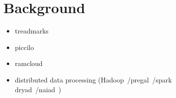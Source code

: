 \section{Background}
\label{sec:background}

\begin{itemize}
    \item treadmarks~\cite{Keleher1994}  \\
    \item piccilo~\cite{piccolo}   \\
    \item ramcloud~\cite{Ousterhout:2015:RSS:2818727.2806887}  \\
    \item distributed data processing (Hadoop~\cite{Dean2004}/pregal~\cite{Malewicz:2010:PSL:1807167.1807184}/spark~\cite{180560} \\ dryad~\cite{Isard:2007:DDD:1272996.1273005}/naiad~\cite{Murray:2013:NTD:2517349.2522738})  \\
\end{itemize}
